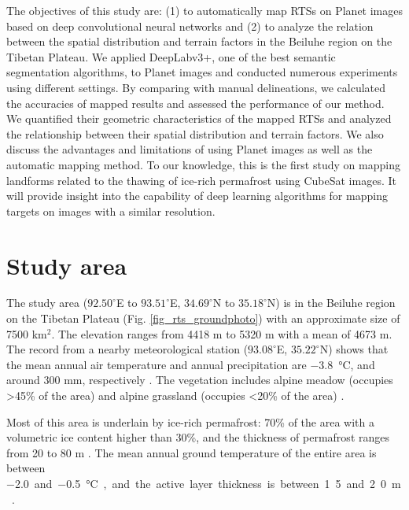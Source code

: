 \documentclass[preprint,12pt,authoryear]{elsarticle}
\begin{document}
The objectives of this study are: (1) to automatically map RTSs on Planet images based on deep convolutional neural networks and (2) to analyze the relation between the spatial distribution and terrain factors in the Beiluhe region on the Tibetan Plateau. We applied DeepLabv3+, one of the best semantic segmentation algorithms, to Planet images and conducted numerous experiments using different settings. By comparing with manual delineations, we calculated the accuracies of mapped results and assessed the performance of our method. We quantified their geometric characteristics of the mapped RTSs and analyzed the relationship between their spatial distribution and terrain factors. We also discuss the advantages and limitations of using Planet images as well as the automatic mapping method. To our knowledge, this is the first study on mapping landforms related to the thawing of ice-rich permafrost using CubeSat images. It will provide insight into the capability of deep learning algorithms for mapping targets on images with a similar resolution. 


\section{Study area}
\label{sec_studyarea}
The study area ($92.50^\circ$E to $93.51^\circ$E, $34.69^\circ$N to $35.18^\circ$N) is in the Beiluhe region on the Tibetan Plateau (Fig. \ref{fig_rts_groundphoto}) with an approximate size of 7500 km$^2$. The elevation ranges from 4418 m to 5320 m with a mean of 4673 m. The record from a nearby meteorological station ($93.08^\circ$E, $35.22^\circ$N) shows that the mean annual air temperature and annual precipitation are \SI{-3.8}{\celsius}, and around 300 mm, respectively \citep{luo_thermokarst_2015}. The vegetation includes alpine meadow (occupies \textgreater 45\% of the area) and alpine grassland (occupies \textless 20\% of the area) \citep{luo_thermokarst_2015}. 

Most of this area is underlain by ice-rich permafrost: 70\% of the area with a volumetric ice content higher than 30\%, 
and the thickness of permafrost ranges from 20 to 80 m \citep{zhou_geocryology_2000, luo_thermokarst_2015}. The mean annual ground temperature of the entire area is between \SI{-2.0} and \SI{-0.5}{\celsius}, and the active layer thickness is between 1.5 and 2.0 m \citep{zhou_geocryology_2000, luo_thermokarst_2015, wu2010changes, wu2015changes}. %
\end{document}
